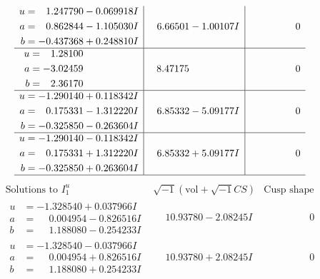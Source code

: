 \documentclass[1p]{elsarticle_modified}
\theoremstyle{definition}
\newcommand{\I}{\sqrt{-1}}
\begin{document}
$$\begin{array}{c|c|c}
\begin{aligned}
u &= \phantom{-}1.247790 - 0.069918 I \\
a &= \phantom{-}0.862844 - 1.105030 I \\
b &= -0.437368 + 0.248810 I\end{aligned}
 & \phantom{-}6.66501 - 1.00107 I & \phantom{-0.000000 } 0 \\ \hline\begin{aligned}
u &= \phantom{-}1.28100\phantom{ +0.000000I} \\
a &= -3.02459\phantom{ +0.000000I} \\
b &= \phantom{-}2.36170\phantom{ +0.000000I}\end{aligned}
 & \phantom{-}8.47175\phantom{ +0.000000I} & \phantom{-0.000000 } 0 \\ \hline\begin{aligned}
u &= -1.290140 + 0.118342 I \\
a &= \phantom{-}0.175331 - 1.312220 I \\
b &= -0.325850 - 0.263604 I\end{aligned}
 & \phantom{-}6.85332 - 5.09177 I & \phantom{-0.000000 } 0 \\ \hline\begin{aligned}
u &= -1.290140 - 0.118342 I \\
a &= \phantom{-}0.175331 + 1.312220 I \\
b &= -0.325850 + 0.263604 I\end{aligned}
 & \phantom{-}6.85332 + 5.09177 I & \phantom{-0.000000 } 0\\
 \hline 
 \end{array}$$\newpage$$\begin{array}{c|c|c}  
\text{Solutions to }I^u_{1}& \I (\text{vol} + \sqrt{-1}CS) & \text{Cusp shape}\\
 \hline 
\begin{aligned}
u &= -1.328540 + 0.037966 I \\
a &= \phantom{-}0.004954 - 0.826516 I \\
b &= \phantom{-}1.188080 - 0.254233 I\end{aligned}
 & \phantom{-}10.93780 - 2.08245 I & \phantom{-0.000000 } 0 \\ \hline\begin{aligned}
u &= -1.328540 - 0.037966 I \\
a &= \phantom{-}0.004954 + 0.826516 I \\
b &= \phantom{-}1.188080 + 0.254233 I\end{aligned}
 & \phantom{-}10.93780 + 2.08245 I & \phantom{-0.000000 } 0 \\ \hline\begin{aligned}

\end{aligned}
\end{array}$$
\end{document}
